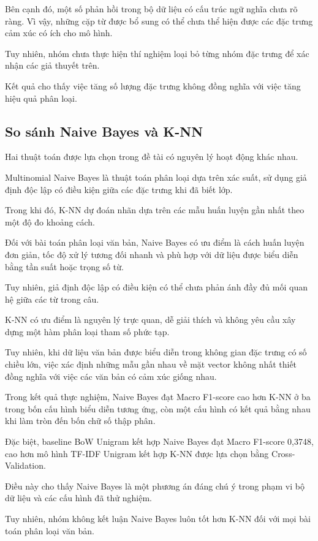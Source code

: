 Bên cạnh đó, một số phản hồi trong bộ dữ liệu
có cấu trúc ngữ nghĩa chưa rõ ràng. Vì vậy,
những cặp từ được bổ sung có thể chưa thể hiện
được các đặc trưng cảm xúc có ích cho mô hình.

Tuy nhiên, nhóm chưa thực hiện thí nghiệm
loại bỏ từng nhóm đặc trưng để xác nhận
các giả thuyết trên.

Kết quả cho thấy việc tăng số lượng đặc trưng
không đồng nghĩa với việc tăng hiệu quả phân loại.


\subsection{So sánh Naive Bayes và K-NN}

Hai thuật toán được lựa chọn trong đề tài
có nguyên lý hoạt động khác nhau.

Multinomial Naive Bayes là thuật toán phân loại
dựa trên xác suất, sử dụng giả định độc lập có
điều kiện giữa các đặc trưng khi đã biết lớp.

Trong khi đó, K-NN dự đoán nhãn dựa trên các
mẫu huấn luyện gần nhất theo một độ đo khoảng cách.

Đối với bài toán phân loại văn bản, Naive Bayes
có ưu điểm là cách huấn luyện đơn giản, tốc độ
xử lý tương đối nhanh và phù hợp với dữ liệu
được biểu diễn bằng tần suất hoặc trọng số từ.

Tuy nhiên, giả định độc lập có điều kiện
có thể chưa phản ánh đầy đủ mối quan hệ
giữa các từ trong câu.

K-NN có ưu điểm là nguyên lý trực quan,
dễ giải thích và không yêu cầu xây dựng
một hàm phân loại tham số phức tạp.

Tuy nhiên, khi dữ liệu văn bản được biểu diễn
trong không gian đặc trưng có số chiều lớn,
việc xác định những mẫu gần nhau về mặt vector
không nhất thiết đồng nghĩa với việc các
văn bản có cảm xúc giống nhau.

Trong kết quả thực nghiệm, Naive Bayes đạt
Macro F1-score cao hơn K-NN ở ba trong bốn
cấu hình biểu diễn tương ứng, còn một
cấu hình có kết quả bằng nhau khi làm tròn
đến bốn chữ số thập phân.

Đặc biệt, baseline BoW Unigram kết hợp
Naive Bayes đạt Macro F1-score 0,3748,
cao hơn mô hình TF-IDF Unigram kết hợp
K-NN được lựa chọn bằng Cross-Validation.

Điều này cho thấy Naive Bayes là một phương án
đáng chú ý trong phạm vi bộ dữ liệu và
các cấu hình đã thử nghiệm.

Tuy nhiên, nhóm không kết luận Naive Bayes
luôn tốt hơn K-NN đối với mọi bài toán
phân loại văn bản.

